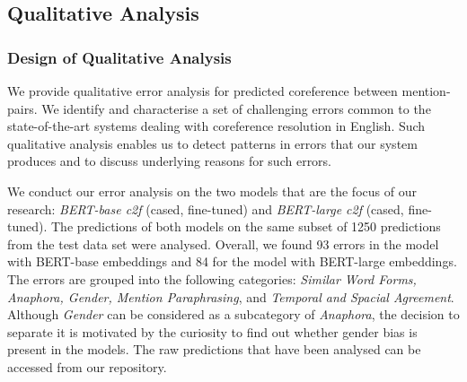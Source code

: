 \documentclass[11pt]{article}
\begin{document}
\subsection{Qualitative Analysis}


\subsubsection{Design of Qualitative Analysis}



We provide qualitative error analysis for predicted coreference between mention-pairs. We identify and characterise a set of challenging errors common to the state-of-the-art systems dealing with coreference resolution in English. Such qualitative analysis enables us to detect patterns in errors that our system produces and to discuss underlying reasons for such errors. 

We conduct our error analysis on the two models that are the focus of our research: \textit{BERT-base c2f} (cased, fine-tuned) and \textit{BERT-large c2f} (cased, fine-tuned). The predictions of both models on the same subset of 1250 predictions from the test data set were analysed. Overall, we found 93 errors in the model with BERT-base embeddings and 84 for the model with BERT-large embeddings. The errors are grouped into the following categories: \textit{Similar Word Forms, Anaphora, Gender, Mention Paraphrasing}, and \textit{Temporal and Spacial Agreement}. Although \textit{Gender} can be considered as a subcategory of \textit{Anaphora}, the decision to separate it is motivated by the curiosity to find out whether gender bias is present in the models.
The raw predictions that have been analysed can be accessed from our repository. 
\end{document}
